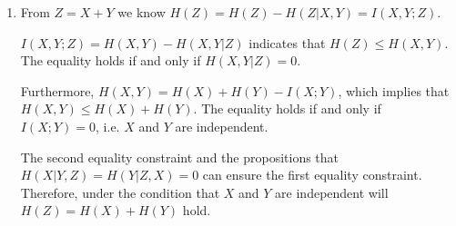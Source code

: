 \begin{exercise}
\begin{solution}
\begin{enumerate}
{      \begin{table}[H]
        \begin{center}  
          \begin{tabular}{|c|c|c|c|}
          \hline
          \multicolumn{2}{|c|}{\multirow{2}{*}{Prob}} & \multicolumn{2}{c|}{$x$}      \\ \cline{3-4} 
          \multicolumn{2}{|c|}{}                      & $0$           & $1$           \\ \hline
          \multirow{2}{*}{$y$}         & $0$          & $\frac{1}{2}$ & $0$           \\ \cline{2-4} 
                                      & $-1$         & $0$           & $\frac{1}{2}$ \\ \hline
          \end{tabular}
        \end{center}
      \end{table}

      The entropy of $X$ and $Y$ are 
      $$H(X)=H(Y) = \frac{1}{2}\log 2 + \frac{1}{2}\log 2 = 1$$
      The distribution of $Z=X+Y$ is $\Pr(Z=0) = 1$, which results in the entropy $H(Z) = 0 < H(X) = H(Y)$.    
    }

    \item {
      From $Z = X + Y$ we know $H(Z)=H(Z) - H(Z|X,Y) = I(X,Y;Z)$.

      $I(X,Y;Z) = H(X,Y)-H(X,Y|Z)$ indicates that $H(Z) \le H(X,Y)$. The equality holds if and only if $H(X,Y|Z) = 0$.
      
      Furthermore, $H(X,Y) = H(X) + H(Y) - I(X;Y)$, which implies that $H(X,Y)\le H(X) + H(Y)$. The equality holds if and only if $I(X;Y) = 0$, i.e. $X$ and $Y$ are independent.

      The second equality constraint and the propositions that $H(X|Y,Z)=H(Y|Z,X) = 0$ can ensure the first equality constraint. Therefore, under the condition that $X$ and $Y$ are independent will $H(Z) = H(X) + H(Y)$ hold.
    }
  \end{enumerate}
\end{solution}
\end{exercise}

